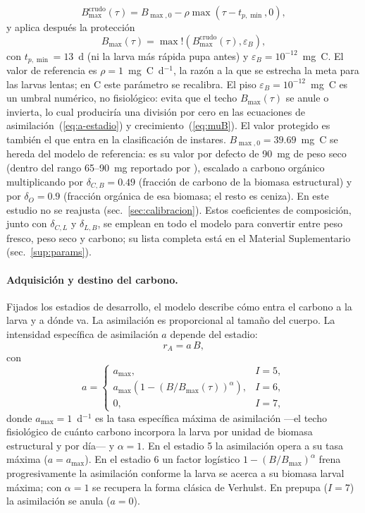 \begin{equation}
  B_{\max}^{\text{crudo}}(\tau) = B_{\max,0} - \rho \max(\tau - t_{p,\min}, 0),
  \label{eq:techo-crudo}
\end{equation}
y aplica después la protección
\begin{equation}
  B_{\max}(\tau) = \max!\left(B_{\max}^{\text{crudo}}(\tau), \varepsilon_B\right),
  \label{eq:techo}
\end{equation}
con $t_{p,\min} = 13$~d (ni la larva más rápida pupa antes) y $\varepsilon_B = 10^{-12}$~mg~C. El valor de referencia es $\rho = 1$~mg~C~d$^{-1}$, la razón a la que se estrecha la meta para las larvas lentas; en C este parámetro se recalibra. El piso $\varepsilon_B = 10^{-12}$~mg~C es un umbral numérico, no fisiológico: evita que el techo $B_{\max}(\tau)$ se anule o invierta, lo cual produciría una división por cero en las ecuaciones de asimilación~(\ref{eq:a-estadio}) y crecimiento~(\ref{eq:muB}). El valor protegido es también el que entra en la clasificación de instares. $B_{\max,0} = 39.69$~mg~C se hereda del modelo de referencia: es su valor por defecto de 90~mg de peso seco (dentro del rango 65--90~mg reportado por \citeauthor{eriksenDynamicModellingFeed2022}), escalado a carbono orgánico multiplicando por $\delta_{C,B} = 0.49$ (fracción de carbono de la biomasa estructural) y por $\delta_O = 0.9$ (fracción orgánica de esa biomasa; el resto es ceniza). En este estudio no se reajusta (sec.~\ref{sec:calibracion}). Estos coeficientes de composición, junto con $\delta_{C,L}$ y $\delta_{L,B}$, se emplean en todo el modelo para convertir entre peso fresco, peso seco y carbono; su lista completa está en el Material Suplementario (sec.~\ref{sup:params}).

\paragraph{Adquisición y destino del carbono.}
Fijados los estadios de desarrollo, el modelo describe cómo entra el carbono a la larva y a dónde va. La asimilación es proporcional al tamaño del cuerpo. La intensidad específica de asimilación $a$ depende del estadio:
\begin{equation}
  r_A = a\,B,
  \label{eq:asim}
\end{equation}
con
\begin{equation}
  a = \begin{cases}
    a_{\max}, & I = 5, \\[4pt]
    a_{\max}\left(1 - (B/B_{\max}(\tau))^{\alpha}\right), & I = 6, \\[4pt]
    0, & I = 7,
  \end{cases}
  \label{eq:a-estadio}
\end{equation}
donde $a_{\max} = 1$~d$^{-1}$ es la tasa específica máxima de asimilación ---el techo fisiológico de cuánto carbono incorpora la larva por unidad de biomasa estructural y por día--- y $\alpha = 1$. 
En el estadio 5 la asimilación opera a su tasa máxima ($a = a_{\max}$). En el estadio 6 un factor logístico $1 - (B/B_{\max})^\alpha$ frena progresivamente la asimilación conforme la larva se acerca a su biomasa larval máxima; con $\alpha = 1$ se recupera la forma clásica de Verhulst. En prepupa ($I = 7$) la asimilación se anula ($a = 0$).

